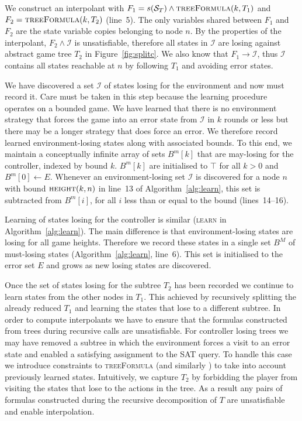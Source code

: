 
We construct an interpolant with $F_1 = s(\mathcal{S}_T) \land \textsc{treeFormula}(k, T_1)$ and $F_2 = \textsc{treeFormula}(k, T_2)$ (line~5). The only variables shared between $F_1$ and $F_2$ are the state variable copies belonging to node $n$. By the properties of the interpolant, $F_2 \land \mathcal{I}$ is unsatisfiable, therefore all states in $\mathcal{I}$ are losing against abstract game tree $T_2$ in Figure~\ref{fig:splitc}.  We also know that $F_1 \to \mathcal{I}$, thus $\mathcal{I}$ contains all states reachable at $n$ by following $T_1$ and avoiding error states.  

We have discovered a set $\mathcal{I}$ of states losing for the environment and now must record it. Care must be taken in this step because the learning procedure operates on a bounded game. We have learned that there is no environment strategy that forces the game into an error state from $\mathcal{I}$ in $k$ rounds or less but there may be a longer strategy that does force an error.  We therefore record learned environment-losing states along with associated bounds.  To this end, we maintain a conceptually infinite array of sets $B^m[k]$ that are may-losing for the controller, indexed by bound $k$.  $B^m[k]$ are initialised to $\top$ for all $k>0$ and $B^m[0] \gets E$.  Whenever an environment-losing set $\mathcal{I}$ is discovered for a node $n$ with bound $\textsc{height}(k, n)$ in line~13 of Algorithm~\ref{alg:learn}, this set is subtracted from $B^m[i]$, for all $i$ less than or equal to the bound (lines~14--16).

Learning of states losing for the controller is similar (\textsc{learn} in Algorithm~\ref{alg:learn}). The main difference is that environment-losing states are losing for all game heights. Therefore we record these states in a single set $B^M$ of must-losing states (Algorithm~\ref{alg:learn}, line~6).  This set is initialised to the error set $E$ and grows as new losing states are discovered.  

Once the set of states losing for the subtree $T_2$ has been recorded we continue to learn states from the other nodes in $T_1$. This achieved by recursively splitting the already reduced $T_1$ and learning the states that lose to a different subtree. In order to compute interpolants we have to ensure that the formulas constructed from trees during recursive calls are unsatisfiable. For controller losing trees we may have removed a subtree in which the environment forces a visit to an error state and enabled a satisfying assignment to the SAT query. To handle this case we introduce constraints to \textsc{treeFormula} (and similarly ) to take into account previously learned states. Intuitively, we capture $T_2$ by forbidding the player from visiting the states that lose to the actions in the tree. As a result any pairs of formulas constructed during the recursive decomposition of $T$ are unsatisfiable and enable interpolation.

